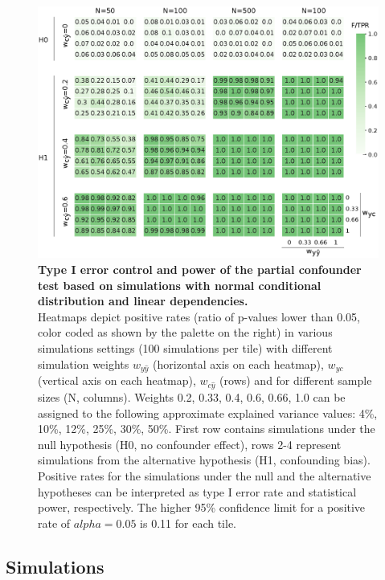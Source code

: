 \documentclass{article}
\begin{document}
\begin{figure}[!b]
  \centering
  \includegraphics[width=0.6\paperwidth]{fig/sim_normal.eps}
  \caption{\textbf{Type I error control and power of the partial confounder test based on simulations with normal conditional distribution and linear dependencies.} \\
  Heatmaps depict positive rates (ratio of p-values lower than 0.05, color coded as shown by the palette on the right) in various simulations settings (100 simulations per tile) with different simulation weights $w_{y\hat{y}}$ (horizontal axis on each heatmap), $w_{yc}$ (vertical axis on each heatmap), $w_{c\hat{y}}$ (rows) and for different sample sizes (N, columns). Weights 0.2, 0.33, 0.4, 0.6, 0.66, 1.0 can be assigned to the following approximate explained variance values: 4\%, 10\%, 12\%, 25\%, 30\%, 50\%. First row contains simulations under the null hypothesis (H0, no confounder effect), rows 2-4 represent simulations from the alternative hypothesis (H1, confounding bias).
  Positive rates for the simulations under the null and the alternative hypotheses can be interpreted as type I error rate and statistical power, respectively. The higher 95\% confidence limit for a positive rate of $alpha=0.05$ is 0.11 for each tile.
  }
  \label{fig:sim-normal}
\end{figure}

\subsection{Simulations}
\end{document}
